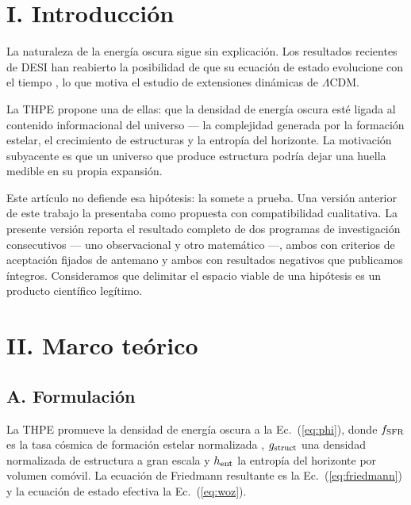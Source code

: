 \documentclass[aps,prd,twocolumn,superscriptaddress,nofootinbib,floatfix]{revtex4-2}
\newcommand{\LCDM}{\ensuremath{\Lambda}CDM}
\begin{document}
\vspace{8pt}

\section*{I. Introducci\'on}

La naturaleza de la energ\'ia oscura sigue sin explicaci\'on. Los
resultados recientes de DESI han reabierto la posibilidad de que su
ecuaci\'on de estado evolucione con el tiempo \cite{DESI2024,DESI2025},
lo que motiva el estudio de extensiones din\'amicas de \LCDM{}.

La THPE propone una de ellas: que la densidad de energ\'ia oscura est\'e
ligada al contenido informacional del universo --- la complejidad
generada por la formaci\'on estelar, el crecimiento de estructuras y la
entrop\'ia del horizonte. La motivaci\'on subyacente es que un universo
que produce estructura podr\'ia dejar una huella medible en su propia
expansi\'on.

Este art\'iculo no defiende esa hip\'otesis: la somete a prueba. Una
versi\'on anterior de este trabajo la presentaba como propuesta con
compatibilidad cualitativa. La presente versi\'on reporta el resultado
completo de dos programas de investigaci\'on consecutivos --- uno
observacional y otro matem\'atico ---, ambos con criterios de
aceptaci\'on fijados de antemano y ambos con resultados negativos que
publicamos \'integros. Consideramos que delimitar el espacio viable de
una hip\'otesis es un producto cient\'ifico leg\'itimo.

\section*{II. Marco te\'orico}

\subsection*{A. Formulaci\'on}

La THPE promueve la densidad de energ\'ia oscura a la
Ec.~(\ref{eq:phi}), donde $f_{\rm SFR}$ es la tasa c\'osmica de
formaci\'on estelar normalizada \cite{Madau2014}, $g_{\rm struct}$ una
densidad normalizada de estructura a gran escala y $h_{\rm ent}$ la
entrop\'ia del horizonte por volumen com\'ovil. La ecuaci\'on de
Friedmann resultante es la Ec.~(\ref{eq:friedmann}) y la ecuaci\'on de
estado efectiva la Ec.~(\ref{eq:woz}).
\end{document}
